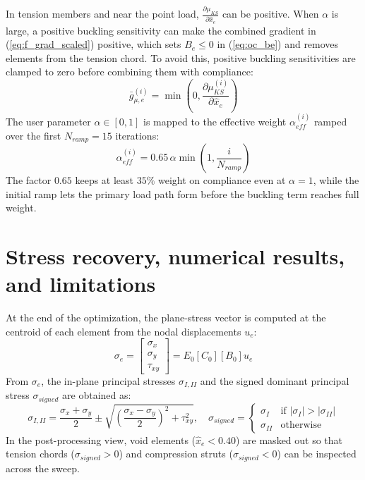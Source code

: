 \documentclass{article}
\begin{document}
In tension members and near the point load, $\frac{\partial \mu_{KS}}{\partial \hat{x}_e}$ can be positive. When $\alpha$ is large, a positive buckling sensitivity can make the combined gradient in (\ref{eq:f_grad_scaled}) positive, which sets $B_e \leq 0$ in (\ref{eq:oc_be}) and removes elements from the tension chord. To avoid this, positive buckling sensitivities are clamped to zero before combining them with compliance:
\begin{equation}\label{eq:g_clamp}
\bar{g}_{\mu, e}^{(i)} = \min\left(0, \frac{\partial \mu_{KS}^{(i)}}{\partial \hat{x}_e}\right)
\end{equation}
The user parameter $\alpha \in [0, 1]$ is mapped to the effective weight $\alpha_{eff}^{(i)}$ ramped over the first $N_{ramp} = 15$ iterations:
\begin{equation}\label{eq:alpha_eff}
\alpha_{eff}^{(i)} = 0.65\,\alpha \min\left(1, \frac{i}{N_{ramp}}\right)
\end{equation}
The factor $0.65$ keeps at least $35\%$ weight on compliance even at $\alpha = 1$, while the initial ramp lets the primary load path form before the buckling term reaches full weight.

\section{Stress recovery, numerical results, and limitations}

\noindent At the end of the optimization, the plane-stress vector is computed at the centroid of each element from the nodal displacements $u_e$:
\begin{equation}\label{eq:sigma_rec}
\sigma_e = \begin{bmatrix} \sigma_x \\ \sigma_y \\ \tau_{xy} \end{bmatrix} = E_0 [C_0] [B_0] u_e
\end{equation}
From $\sigma_e$, the in-plane principal stresses $\sigma_{I, II}$ and the signed dominant principal stress $\sigma_{signed}$ are obtained as:
\begin{equation}\label{eq:sigma_signed}
\sigma_{I, II} = \frac{\sigma_x + \sigma_y}{2} \pm \sqrt{\left(\frac{\sigma_x - \sigma_y}{2}\right)^2 + \tau_{xy}^2}, \quad \sigma_{signed} = \begin{cases} \sigma_I & \text{if } |\sigma_I| > |\sigma_{II}| \\ \sigma_{II} & \text{otherwise} \end{cases}
\end{equation}
In the post-processing view, void elements ($\hat{x}_e < 0.40$) are masked out so that tension chords ($\sigma_{signed} > 0$) and compression struts ($\sigma_{signed} < 0$) can be inspected across the sweep.
\end{document}
